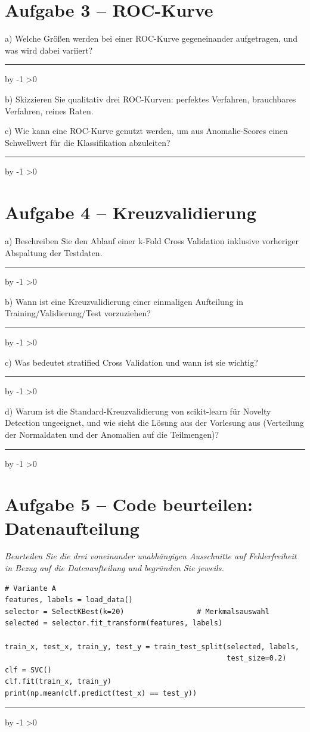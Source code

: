 \documentclass[10pt,a4paper]{article}
\newcommand{\antwortlinien}[1]{%
  \par\vspace{2pt}%
  \newcount\zeilen \zeilen=#1
  \loop
    \noindent\rule{\linewidth}{0.4pt}\par\vspace{11pt}%
    \advance\zeilen by -1
  \ifnum\zeilen>0 \repeat
}
\begin{document}
\section*{Aufgabe 3 -- ROC-Kurve}

a) Welche Größen werden bei einer ROC-Kurve gegeneinander aufgetragen, und was wird dabei
variiert?
\antwortlinien{2}

b) Skizzieren Sie qualitativ drei ROC-Kurven: perfektes Verfahren, brauchbares Verfahren,
reines Raten.

\vspace{4.5cm}

c) Wie kann eine ROC-Kurve genutzt werden, um aus Anomalie-Scores einen Schwellwert
für die Klassifikation abzuleiten?
\antwortlinien{3}

\section*{Aufgabe 4 -- Kreuzvalidierung}

a) Beschreiben Sie den Ablauf einer k-Fold Cross Validation inklusive vorheriger Abspaltung
der Testdaten.
\antwortlinien{4}

b) Wann ist eine Kreuzvalidierung einer einmaligen Aufteilung in Training/Validierung/Test
vorzuziehen?
\antwortlinien{2}

c) Was bedeutet \glqq stratified\grqq{} Cross Validation und wann ist sie wichtig?
\antwortlinien{2}

d) Warum ist die Standard-Kreuzvalidierung von scikit-learn für Novelty Detection ungeeignet,
und wie sieht die Lösung aus der Vorlesung aus (Verteilung der Normaldaten und der Anomalien
auf die Teilmengen)?
\antwortlinien{4}

\section*{Aufgabe 5 -- Code beurteilen: Datenaufteilung}

\emph{Beurteilen Sie die drei voneinander unabhängigen Ausschnitte auf Fehlerfreiheit in Bezug
auf die Datenaufteilung und begründen Sie jeweils.}

\Needspace*{6cm}
\begin{lstlisting}
# Variante A
features, labels = load_data()
selector = SelectKBest(k=20)                 # Merkmalsauswahl
selected = selector.fit_transform(features, labels)

train_x, test_x, train_y, test_y = train_test_split(selected, labels,
                                                    test_size=0.2)
clf = SVC()
clf.fit(train_x, train_y)
print(np.mean(clf.predict(test_x) == test_y))
\end{lstlisting}
\antwortlinien{3}
\end{document}

